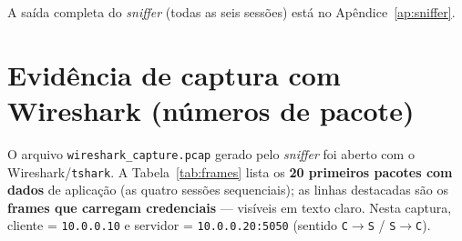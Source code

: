 \documentclass[11pt,a4paper]{article}
\begin{document}
A saída completa do \textit{sniffer} (todas as seis sessões) está no
Apêndice~\ref{ap:sniffer}.

\section{Evidência de captura com Wireshark (números de pacote)}
\label{sec:wireshark}

O arquivo \texttt{wireshark_capture.pcap} gerado pelo \textit{sniffer} foi aberto com o
Wireshark/\texttt{tshark}. A Tabela~\ref{tab:frames} lista os \textbf{20 primeiros
pacotes com dados} de aplicação (as quatro sessões sequenciais); as linhas
destacadas são os \textbf{frames que carregam credenciais} — visíveis em texto
claro. Nesta captura, cliente = \texttt{10.0.0.10} e servidor =
\texttt{10.0.0.20:5050} (sentido \texttt{C$\rightarrow$S} / \texttt{S$\rightarrow$C}).
\end{document}
